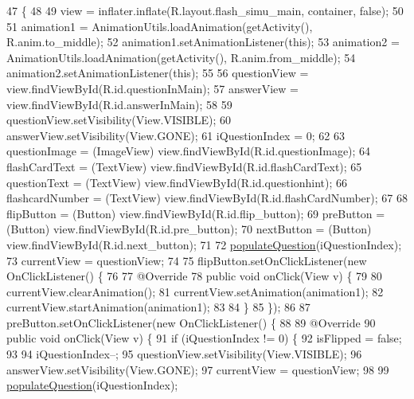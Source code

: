 \begin{DoxyCode}
47                                                                                                       \{
48 
49         view = inflater.inflate(R.layout.flash\_simu\_main, container, \textcolor{keyword}{false});
50 
51         animation1 = AnimationUtils.loadAnimation(getActivity(), R.anim.to\_middle);
52         animation1.setAnimationListener(\textcolor{keyword}{this});
53         animation2 = AnimationUtils.loadAnimation(getActivity(), R.anim.from\_middle);
54         animation2.setAnimationListener(\textcolor{keyword}{this});
55 
56         questionView = view.findViewById(R.id.questionInMain);
57         answerView = view.findViewById(R.id.answerInMain);
58 
59         questionView.setVisibility(View.VISIBLE);
60         answerView.setVisibility(View.GONE);
61         iQuestionIndex = 0;
62 
63         questionImage = (ImageView) view.findViewById(R.id.questionImage);
64         flashCardText = (TextView) view.findViewById(R.id.flashCardText);
65         questionText = (TextView) view.findViewById(R.id.questionhint);
66         flashcardNumber = (TextView) view.findViewById(R.id.flashCardNumber);
67 
68         flipButton = (Button) view.findViewById(R.id.flip\_button);
69         preButton = (Button) view.findViewById(R.id.pre\_button);
70         nextButton = (Button) view.findViewById(R.id.next\_button);
71 
72         \hyperlink{classorg_1_1buildmlearn_1_1toolkit_1_1flashcardtemplate_1_1MainFragment_a4cbd053b83f6e1d0296a7d60639dfd8d}{populateQuestion}(iQuestionIndex);
73         currentView = questionView;
74 
75         flipButton.setOnClickListener(\textcolor{keyword}{new} OnClickListener() \{
76 
77             @Override
78             \textcolor{keyword}{public} \textcolor{keywordtype}{void} onClick(View v) \{
79 
80                 currentView.clearAnimation();
81                 currentView.setAnimation(animation1);
82                 currentView.startAnimation(animation1);
83 
84             \}
85         \});
86 
87         preButton.setOnClickListener(\textcolor{keyword}{new} OnClickListener() \{
88 
89             @Override
90             \textcolor{keyword}{public} \textcolor{keywordtype}{void} onClick(View v) \{
91                 \textcolor{keywordflow}{if} (iQuestionIndex != 0) \{
92                     isFlipped = \textcolor{keyword}{false};
93 
94                     iQuestionIndex--;
95                     questionView.setVisibility(View.VISIBLE);
96                     answerView.setVisibility(View.GONE);
97                     currentView = questionView;
98 
99                     \hyperlink{classorg_1_1buildmlearn_1_1toolkit_1_1flashcardtemplate_1_1MainFragment_a4cbd053b83f6e1d0296a7d60639dfd8d}{populateQuestion}(iQuestionIndex);

\end{DoxyCode}
